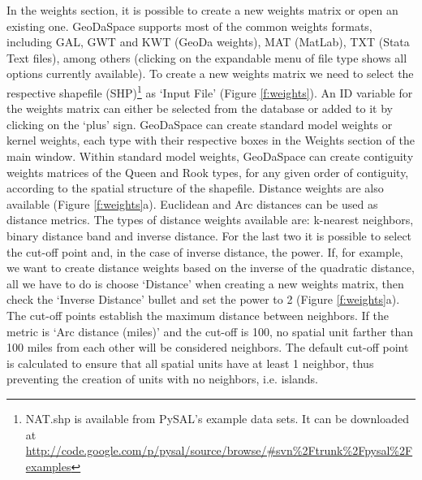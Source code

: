 \documentclass{article}
\begin{document}
In the weights section, it is possible to create a new weights matrix or open an existing one. GeoDaSpace supports most of the common weights formats, including GAL, GWT and KWT (GeoDa weights), MAT (MatLab), TXT (Stata Text files), among others (clicking on the expandable menu of file type shows all options currently available). To create a new weights matrix we need to select the respective shapefile (SHP)\footnote{NAT.shp is available from PySAL's example data sets. It can be downloaded at \url{http://code.google.com/p/pysal/source/browse/\#svn\%2Ftrunk\%2Fpysal\%2Fexamples}} as `Input File' (Figure \ref{f:weights}). An ID variable for the weights matrix can either be selected from the database or added to it by clicking on the `plus' sign. GeoDaSpace can create standard model weights or kernel weights, each type with their respective boxes in the Weights section of the main window. Within standard model weights, GeoDaSpace can create contiguity weights matrices of the Queen and Rook types, for any given order of contiguity, according to the spatial structure of the shapefile. Distance weights are also available (Figure \ref{f:weights}a). Euclidean and Arc distances can be used as distance metrics. The types of distance weights available are: k-nearest neighbors, binary distance band and inverse distance. For the last two it is possible to select the cut-off point and, in the case of inverse distance, the power. If, for example, we want to create distance weights based on the inverse of the quadratic distance, all we have to do is choose `Distance' when creating a new weights matrix, then check the `Inverse Distance' bullet and set the power to 2 (Figure \ref{f:weights}a). The cut-off points establish the maximum distance between neighbors. If the metric is `Arc distance (miles)' and the cut-off is 100, no spatial unit farther than 100 miles from each other will be considered neighbors. The default cut-off point is calculated to ensure that all spatial units have at least 1 neighbor, thus preventing the creation of units with no neighbors, i.e. islands.
\end{document}
